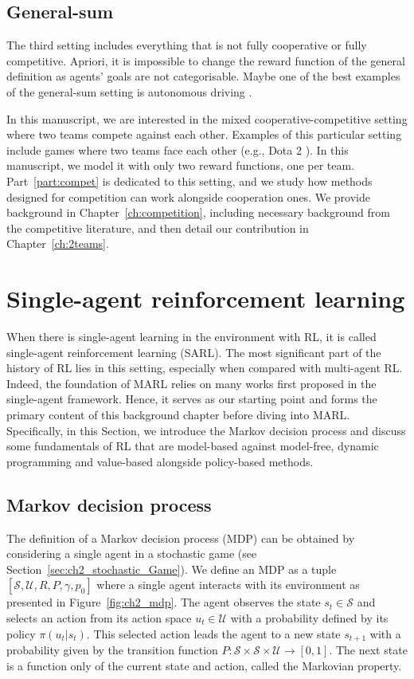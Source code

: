 \subsection{General-sum} 
\label{sec:ch2_general_sum}
The third setting includes everything that is not fully cooperative or fully competitive.
Apriori, it is impossible to change the reward function of the general definition as agents' goals are not categorisable.
Maybe one of the best examples of the general-sum setting is autonomous driving \citep{dinneweth2022multi}.

In this manuscript, we are interested in the mixed cooperative-competitive setting where two teams compete against each other.
Examples of this particular setting include games where two teams face each other (e.g., Dota 2 \citep{openai2019dota}).
In this manuscript, we model it with only two reward functions, one per team.
Part~\ref{part:compet} is dedicated to this setting, and we study how methods designed for competition can work alongside cooperation ones.
We provide background in Chapter~\ref{ch:competition}, including necessary background from the competitive literature, and then detail our contribution in Chapter~\ref{ch:2teams}.

\section{Single-agent reinforcement learning} 
\label{sec:ch2_single_agent_RL}
When there is single-agent learning in the environment with RL, it is called single-agent reinforcement learning (SARL).
The most significant part of the history of RL lies in this setting, especially when compared with multi-agent RL.
Indeed, the foundation of MARL relies on many works first proposed in the single-agent framework.
Hence, it serves as our starting point and forms the primary content of this background chapter before diving into MARL.
Specifically, in this Section, we introduce the Markov decision process and discuss some fundamentals of RL that are model-based against model-free, dynamic programming and value-based alongside policy-based methods.

\subsection{Markov decision process}
\label{sec:ch2_mdp}

The definition of a Markov decision process (MDP) can be obtained by considering a single agent in a stochastic game (see Section~\ref{sec:ch2_stochastic_Game}).
We define an MDP as a tuple $[\mathcal{S}, \mathcal{U}, R, P, \gamma, p_0]$ where a single agent interacts with its environment as presented in Figure~\ref{fig:ch2_mdp}.
The agent observes the state $s_t \in \mathcal{S}$ and selects an action from its action space $u_t \in \mathcal{U}$ with a probability defined by its policy $\pi(u_t|s_t)$.
This selected action leads the agent to a new state $s_{t+1}$ with a probability given by the transition function $P:\mathcal{S} \times \mathcal{S} \times \mathcal{U} \rightarrow [0,1]$.
The next state is a function only of the current state and action, called the Markovian property.


